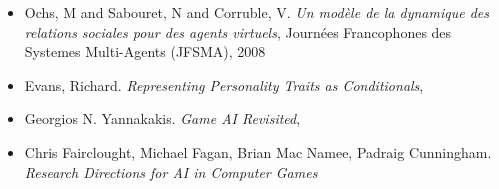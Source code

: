 \documentclass[asi]{picINSAIA}
\begin{document}
\begin{itemize}
\item Ochs, M and Sabouret, N and Corruble, V.
  \textsl{Un mod{\`e}le de la dynamique des relations sociales pour des agents virtuels},
  Journ{\'e}es Francophones des Systemes Multi-Agents (JFSMA),
  2008


\item Evans, Richard.
  \textsl{Representing Personality Traits as Conditionals},

\item Georgios N. Yannakakis.
  \textsl{Game AI Revisited},
  
\item Chris Fairclought, Michael Fagan, Brian Mac Namee, Padraig Cunningham.
  \textsl{Research Directions for AI in Computer Games}
  
\end{itemize}
\end{document}
